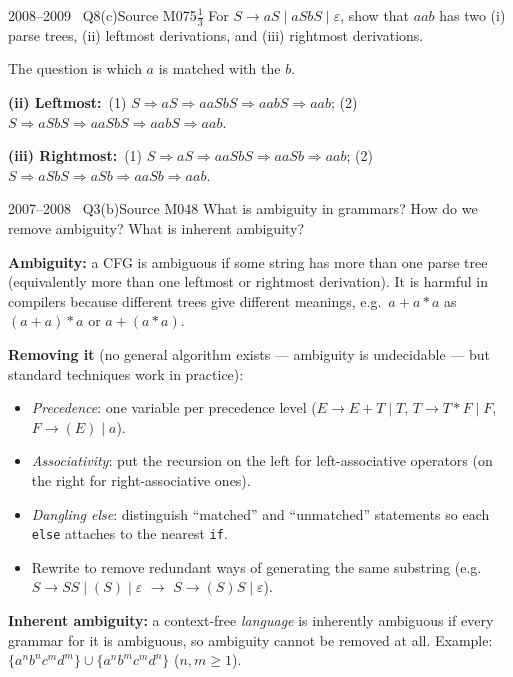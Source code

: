 \documentclass[11pt,a4paper]{article}
\newcommand{\eps}{\varepsilon}
\newcommand{\fig}[1]{\par\smallskip\begin{center}\adjustbox{max width=\linewidth}{#1}\end{center}\vspace{-2pt}}
\begin{document}
\begin{question}{2008--2009 \textbullet\ Q8(c)}{Source M07}{5$\tfrac13$}
For $S\to aS\mid aSbS\mid\eps$, show that $aab$ has two (i) parse trees, (ii) leftmost derivations, and (iii) rightmost derivations.
\end{question}
\begin{solution}
The question is which $a$ is matched with the $b$.
\fig{\begin{forest}pt [$S$ [$a$] [$S$ [$a$] [$S$ [$\eps$]] [$b$] [$S$ [$\eps$]]]]\end{forest}\hspace{2cm}
\begin{forest}pt [$S$ [$a$] [$S$ [$a$] [$S$ [$\eps$]]] [$b$] [$S$ [$\eps$]]]\end{forest}}
\textbf{(ii) Leftmost:}\
(1) $S\Rightarrow aS\Rightarrow aaSbS\Rightarrow aabS\Rightarrow aab$;\quad
(2) $S\Rightarrow aSbS\Rightarrow aaSbS\Rightarrow aabS\Rightarrow aab$.

\textbf{(iii) Rightmost:}\
(1) $S\Rightarrow aS\Rightarrow aaSbS\Rightarrow aaSb\Rightarrow aab$;\quad
(2) $S\Rightarrow aSbS\Rightarrow aSb\Rightarrow aaSb\Rightarrow aab$.
\end{solution}

\begin{question}{2007--2008 \textbullet\ Q3(b)}{Source M04}{8}
What is ambiguity in grammars? How do we remove ambiguity? What is inherent ambiguity?
\end{question}
\begin{solution}
\textbf{Ambiguity:} a CFG is ambiguous if some string has more than one parse tree (equivalently more than one leftmost or rightmost derivation). It is harmful in compilers because different trees give different meanings, e.g.\ $a+a*a$ as $(a+a)*a$ or $a+(a*a)$.

\textbf{Removing it} (no general algorithm exists --- ambiguity is undecidable --- but standard techniques work in practice):
\begin{itemize}
\item \emph{Precedence}: one variable per precedence level ($E\to E+T\mid T$, $T\to T*F\mid F$, $F\to(E)\mid a$).
\item \emph{Associativity}: put the recursion on the left for left-associative operators (on the right for right-associative ones).
\item \emph{Dangling else}: distinguish ``matched'' and ``unmatched'' statements so each \texttt{else} attaches to the nearest \texttt{if}.
\item Rewrite to remove redundant ways of generating the same substring (e.g.\ $S\to SS\mid(S)\mid\eps$ $\to$ $S\to(S)S\mid\eps$).
\end{itemize}
\textbf{Inherent ambiguity:} a context-free \emph{language} is inherently ambiguous if every grammar for it is ambiguous, so ambiguity cannot be removed at all. Example: $\{a^nb^nc^md^m\}\cup\{a^nb^mc^md^n\}$ ($n,m\ge1$).
\end{solution}
\end{document}

